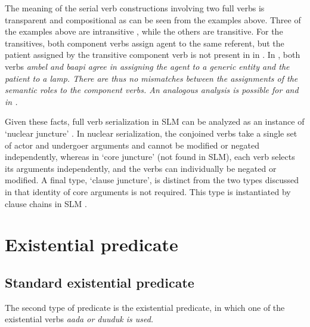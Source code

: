 The meaning of the serial verb constructions involving two full verbs is transparent and compositional as can be seen from the examples above.  Three of the examples above are intransitive , while the others are transitive. For the transitives, both component verbs assign agent to the same referent, but the patient assigned by the transitive component verb is not present in  in . In , both verbs \em ambel \em and \em baapi \em agree in assigning the agent to a generic entity and the patient to a lamp. There are thus no mismatches between the assignments of the semantic roles to the component verbs. An analogous analysis is possible for  and  in .

Given these facts, full verb serialization in SLM can be analyzed as an instance of `nuclear juncture' \citep{FoleyEtAl1985, VanValinEtAl1997rrg}. In nuclear serialization, the conjoined verbs take a single set of actor and undergoer arguments and cannot be modified or negated independently, whereas in `core juncture' (not found in SLM), each verb selects its arguments independently, and the verbs can individually be negated or modified. A final type, `clause juncture', is distinct from the two types discussed in that identity of core arguments is not required. This type is instantiated by clause chains in SLM .




\section{Existential predicate}\label{sec:pred:Existentialpredicate}
\subsection{Standard existential predicate}
The second type of predicate is the existential predicate, in which one of the existential verbs  \em aada \em or \em duuduk \em is used.

